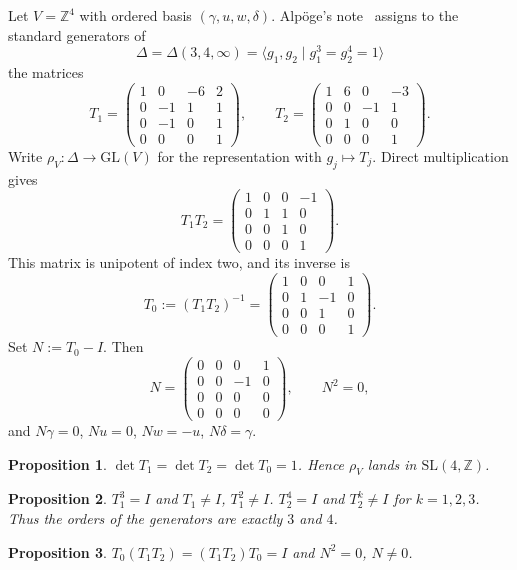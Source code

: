 \documentclass[11pt,a4paper]{article}
\newtheorem{proposition}{Proposition}
\theoremstyle{definition}
\theoremstyle{remark}
\newcommand{\Z}{\mathbb{Z}}
\begin{document}
Let $V=\Z^4$ with ordered basis $(\gamma,u,w,\delta)$. Alp\"oge's note~\cite{AlpogeS6} assigns to the standard generators of
\[
\Delta=\Delta(3,4,\infty)=\langle g_1,g_2\mid g_1^3=g_2^4=1\rangle
\]
the matrices
\[
T_1=\begin{pmatrix}1&0&-6&2\\0&-1&1&1\\0&-1&0&1\\0&0&0&1\end{pmatrix},\qquad
T_2=\begin{pmatrix}1&6&0&-3\\0&0&-1&1\\0&1&0&0\\0&0&0&1\end{pmatrix}.
\]
Write $\rho_V:\Delta\to\mathrm{GL}(V)$ for the representation with $g_j\mapsto T_j$. Direct multiplication gives
\[
T_1T_2=\begin{pmatrix}1&0&0&-1\\0&1&1&0\\0&0&1&0\\0&0&0&1\end{pmatrix}.
\]
This matrix is unipotent of index two, and its inverse is
\[
T_0:=(T_1T_2)^{-1}=\begin{pmatrix}1&0&0&1\\0&1&-1&0\\0&0&1&0\\0&0&0&1\end{pmatrix}.
\]
Set $N:=T_0-I$. Then
\[
N=\begin{pmatrix}0&0&0&1\\0&0&-1&0\\0&0&0&0\\0&0&0&0\end{pmatrix},\qquad N^2=0,
\]
and $N\gamma=0$, $Nu=0$, $Nw=-u$, $N\delta=\gamma$.

\begin{proposition}
$\det T_1=\det T_2=\det T_0=1$. Hence $\rho_V$ lands in $\mathrm{SL}(4,\Z)$.
\end{proposition}

\begin{proposition}
$T_1^3=I$ and $T_1\neq I$, $T_1^2\neq I$. $T_2^4=I$ and $T_2^k\neq I$ for $k=1,2,3$. Thus the orders of the generators are exactly $3$ and $4$.
\end{proposition}

\begin{proposition}
$T_0(T_1T_2)=(T_1T_2)T_0=I$ and $N^2=0$, $N\neq 0$.
\end{proposition}
\end{document}
